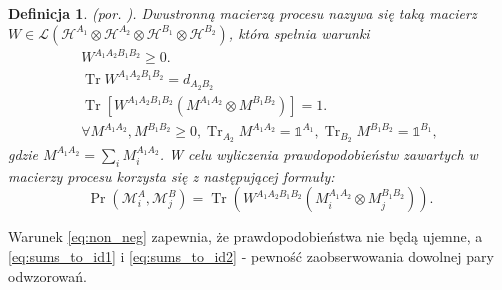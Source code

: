 \documentclass[10pt]{article} %
\newtheorem{definicja}{Definicja}
\DeclareMathOperator{\Trs}{Tr}
\newcommand{\Mats}[1]{\mathcal{L}(#1)}
\newcommand{\Hx}[1]{\mathcal{H}^{#1}}
\newcommand{\MXin}[2]{\mathcal{M}^{#1}_{#2}}
\newcommand{\MAin}[0]{\MXin{A}{i}}
\newcommand{\Tr}[1]{\Trs(#1)}
\newcommand{\Prt}[2]{\Pr(#1, #2)}
\newcommand{\WAll}{W^{A_1A_2B_1B_2}}
\newcommand{\MA}{M^{A_1A_2}}
\newcommand{\MB}{M^{B_1B_2}}
\newcommand{\mai}[1]{\MA_{#1}}
\begin{document}
\begin{definicja}
(por. \cite{process_matrix}).
Dwustronną macierzą procesu nazywa się taką macierz $W  \in \Mats{\Hx{A_1} \otimes \Hx{A_2} \otimes \Hx{B_1} \otimes \Hx{B_2}}$, która spełnia warunki
\begin{gather}
\label{eq:non_neg}
\WAll \geq 0. \\
\label{norm}
\Trs \WAll = d_{A_2B_2} \\
\label{eq:sums_to_id1}
\Trs
\left[
\WAll
\left(
M^{A_1A_2} \otimes M^{B_1B_2}
\right)
\right]=1.\\
\label{eq:sums_to_id2}
\forall M^{A_1A_2}, M^{B_1B_2} \geq 0, \Trs_{A_2} \MA = \mathbb{1}^{A_1}, \Trs_{B_2} \MB = \mathbb{1}^{B_1},
\end{gather}
gdzie $\MA = \sum_i \mai{i}$. W celu wyliczenia prawdopodobieństw zawartych w macierzy procesu korzysta się z następującej formuły:
\begin{equation}
\label{eq:cj_prob}
\Prt{\MAin}{\MXin{B}{j}} = \Tr{\WAll(M^{A_1A_2}_i \otimes M^{B_1B_2}_j)}.
\end{equation}
\end{definicja}
Warunek \eqref{eq:non_neg} zapewnia, że prawdopodobieństwa nie będą ujemne, a \eqref{eq:sums_to_id1} i  \eqref{eq:sums_to_id2} - pewność zaobserwowania dowolnej pary odwzorowań. 
\end{document}
